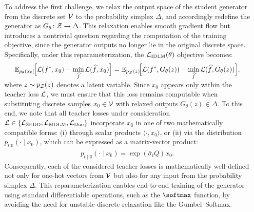 \label{sec:simplex relaxation}
To address the first challenge, we relax the output space of the student generator from the discrete set $\mathcal{V}$ to the
probability simplex $\Delta$, and accordingly redefine the generator as $G_{\theta}\colon \mathcal{Z} \to \Delta$.
This relaxation enables smooth gradient flow but introduces a nontrivial question regarding the computation of
the training objective, since the generator outputs no longer lie in the original discrete space. Specifically,
under this reparameterization, the $\mathcal{L}_{\text{IDLM}}(\theta)$ objective becomes:
\begin{gather}
  \EE_{p_{\theta}(x_0)}\!\Bigl[\LC(f^*, x_0) - \min_{\widehat{f}}\LC(\widehat{f}, x_0)\Bigr]
  = \EE_{p_{\ZC}(z)}\!\Bigl[\LC(f^*, G_{\theta}(z)) - \min_{\widehat{f}}\LC(\widehat{f}, G_{\theta}(z))\Bigr],
  \nonumber
  \vspace{-2mm}
\end{gather}
where $z \sim p_{\mathcal{Z}}(z)$ denotes a latent variable. Since $x_0$ appears only within the teacher loss $\mathcal{L}$,
we must ensure that this loss remains computable when substituting discrete samples $x_0 \in \mathcal{V}$ with relaxed
outputs $G_{\theta}(z) \in \Delta$. To this end, we note that all teacher losses under consideration
$\mathcal{L} \in \{\mathcal{L}_{\text{SEDD}}, \mathcal{L}_{\text{MDLM}}, \mathcal{L}_{\text{Duo}}\}$ incorporate $x_0$ in one of two
mathematically compatible forms: (i) through scalar products $\langle \cdot, x_0 \rangle$, or (ii) via the distribution
$p_{t|0}(\cdot \mid x_0)$, which can be expressed as a matrix-vector product:
\vspace{-1.5mm}
\begin{gather}
    p_{t \mid 0}(\cdot \mid x_0) = \exp\left(\bar{\sigma}_t Q\right)x_0.
    \nonumber
\end{gather}
%
Consequently, each of the considered teacher losses is mathematically well-defined not only for one-hot vectors
from $\mathcal{V}$ but also for any input from the probability simplex $\Delta$. This reparameterization enables end-to-end
training of the generator using standard differentiable operations, such as the $\softmax$ function, by avoiding
the need for unstable discrete relaxation like the Gumbel--Softmax.


